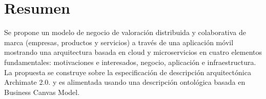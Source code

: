 \chapter*{Resumen}

Se propone un modelo de negocio de valoración distribuida y colaborativa de marca (empresas, productos y servicios) a través de una aplicación móvil mostrando una arquitectura basada en cloud y microservicios en cuatro elementos fundamentales: motivaciones e interesados, negocio, aplicación e infraestructura. La propuesta se construye sobre la especificación de descripción arquitectónica Archimate 2.0. y es alimentada usando una descripción ontológica basada en Business Canvas Model.